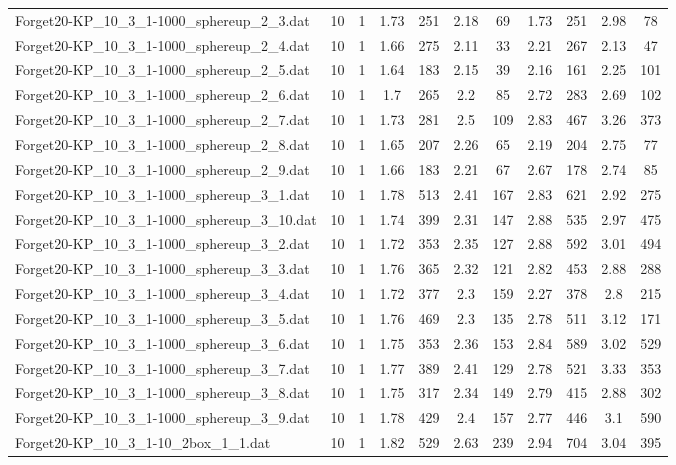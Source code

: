 \begin{table}[!ht]
\begin{tabular}{lcccccccccc}
Forget20-KP\_10\_3\_1-1000\_sphereup\_2\_3.dat & 10 & 1 & 1.73 & 251 & 2.18 & 69 & 1.73 & 251 & 2.98 & 78 \\
Forget20-KP\_10\_3\_1-1000\_sphereup\_2\_4.dat & 10 & 1 & 1.66 & 275 & 2.11 & 33 & 2.21 & 267 & 2.13 & 47 \\
Forget20-KP\_10\_3\_1-1000\_sphereup\_2\_5.dat & 10 & 1 & 1.64 & 183 & 2.15 & 39 & 2.16 & 161 & 2.25 & 101 \\
Forget20-KP\_10\_3\_1-1000\_sphereup\_2\_6.dat & 10 & 1 & 1.7 & 265 & 2.2 & 85 & 2.72 & 283 & 2.69 & 102 \\
Forget20-KP\_10\_3\_1-1000\_sphereup\_2\_7.dat & 10 & 1 & 1.73 & 281 & 2.5 & 109 & 2.83 & 467 & 3.26 & 373 \\
Forget20-KP\_10\_3\_1-1000\_sphereup\_2\_8.dat & 10 & 1 & 1.65 & 207 & 2.26 & 65 & 2.19 & 204 & 2.75 & 77 \\
Forget20-KP\_10\_3\_1-1000\_sphereup\_2\_9.dat & 10 & 1 & 1.66 & 183 & 2.21 & 67 & 2.67 & 178 & 2.74 & 85 \\
Forget20-KP\_10\_3\_1-1000\_sphereup\_3\_1.dat & 10 & 1 & 1.78 & 513 & 2.41 & 167 & 2.83 & 621 & 2.92 & 275 \\
Forget20-KP\_10\_3\_1-1000\_sphereup\_3\_10.dat & 10 & 1 & 1.74 & 399 & 2.31 & 147 & 2.88 & 535 & 2.97 & 475 \\
Forget20-KP\_10\_3\_1-1000\_sphereup\_3\_2.dat & 10 & 1 & 1.72 & 353 & 2.35 & 127 & 2.88 & 592 & 3.01 & 494 \\
Forget20-KP\_10\_3\_1-1000\_sphereup\_3\_3.dat & 10 & 1 & 1.76 & 365 & 2.32 & 121 & 2.82 & 453 & 2.88 & 288 \\
Forget20-KP\_10\_3\_1-1000\_sphereup\_3\_4.dat & 10 & 1 & 1.72 & 377 & 2.3 & 159 & 2.27 & 378 & 2.8 & 215 \\
Forget20-KP\_10\_3\_1-1000\_sphereup\_3\_5.dat & 10 & 1 & 1.76 & 469 & 2.3 & 135 & 2.78 & 511 & 3.12 & 171 \\
Forget20-KP\_10\_3\_1-1000\_sphereup\_3\_6.dat & 10 & 1 & 1.75 & 353 & 2.36 & 153 & 2.84 & 589 & 3.02 & 529 \\
Forget20-KP\_10\_3\_1-1000\_sphereup\_3\_7.dat & 10 & 1 & 1.77 & 389 & 2.41 & 129 & 2.78 & 521 & 3.33 & 353 \\
Forget20-KP\_10\_3\_1-1000\_sphereup\_3\_8.dat & 10 & 1 & 1.75 & 317 & 2.34 & 149 & 2.79 & 415 & 2.88 & 302 \\
Forget20-KP\_10\_3\_1-1000\_sphereup\_3\_9.dat & 10 & 1 & 1.78 & 429 & 2.4 & 157 & 2.77 & 446 & 3.1 & 590 \\
Forget20-KP\_10\_3\_1-10\_2box\_1\_1.dat & 10 & 1 & 1.82 & 529 & 2.63 & 239 & 2.94 & 704 & 3.04 & 395 \\

\end{tabular}
\end{table}
